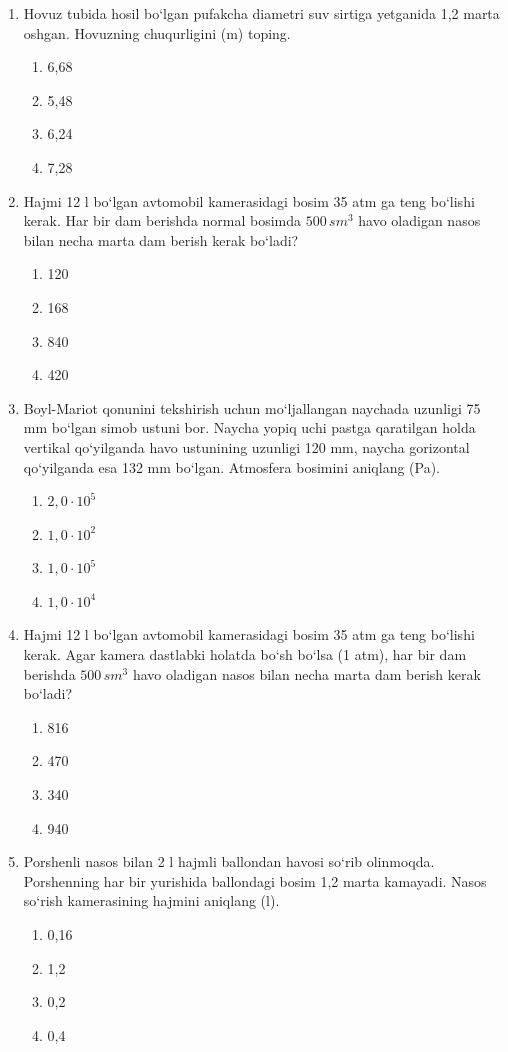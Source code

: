\begin{enumerate}
\item Hovuz tubida hosil bo‘lgan pufakcha diametri suv sirtiga yetganida 1,2 marta oshgan. Hovuzning chuqurligini (m) toping.
\begin{enumerate}[label=\Alph*)]
\item 6,68
\item 5,48
\item 6,24
\item 7,28
\end{enumerate}

\item Hajmi 12 l bo‘lgan avtomobil kamerasidagi bosim 35 atm ga teng bo‘lishi kerak. Har bir dam berishda normal bosimda $500 \, sm^3$ havo oladigan nasos bilan necha marta dam berish kerak bo‘ladi?
\begin{enumerate}[label=\Alph*)]
\item 120
\item 168
\item 840
\item 420
\end{enumerate}

\item Boyl-Mariot qonunini tekshirish uchun mo‘ljallangan naychada uzunligi 75 mm bo‘lgan simob ustuni bor. Naycha yopiq uchi pastga qaratilgan holda vertikal qo‘yilganda havo ustunining uzunligi 120 mm, naycha gorizontal qo‘yilganda esa 132 mm bo‘lgan. Atmosfera bosimini aniqlang (Pa).
\begin{enumerate}[label=\Alph*)]
\item $2,0 \cdot 10^5$
\item $1,0 \cdot 10^2$
\item $1,0 \cdot 10^5$
\item $1,0 \cdot 10^4$
\end{enumerate}

\item Hajmi 12 l bo‘lgan avtomobil kamerasidagi bosim 35 atm ga teng bo‘lishi kerak. Agar kamera dastlabki holatda bo‘sh bo‘lsa (1 atm), har bir dam berishda $500 \, sm^3$ havo oladigan nasos bilan necha marta dam berish kerak bo‘ladi?
\begin{enumerate}[label=\Alph*)]
\item 816
\item 470
\item 340
\item 940
\end{enumerate}

\item Porshenli nasos bilan 2 l hajmli ballondan havosi so‘rib olinmoqda. Porshenning har bir yurishida ballondagi bosim 1,2 marta kamayadi. Nasos so‘rish kamerasining hajmini aniqlang (l).
\begin{enumerate}[label=\Alph*)]
\item 0,16
\item 1,2
\item 0,2
\item 0,4
\end{enumerate}


\end{enumerate}
